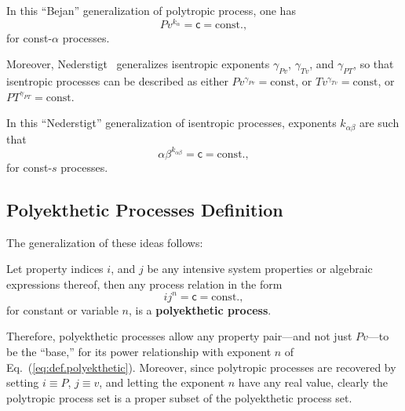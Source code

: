     In this ``Bejan'' generalization of polytropic process, one has
    \begin{equation}
        Pv^{k_{\alpha}} = \mathsf{c} = \mbox{const.},
        \label{eq:gen.Bejan}
    \end{equation}
    \noindent for const-$\alpha$ processes.

    Moreover,  Nederstigt~\cite{2017-NederstigtP-TUDelft}   generalizes   isentropic   exponents
    $\gamma_{Pv}$, $\gamma_{Tv}$,  and  $\gamma_{PT}$,  so  that  isentropic  processes  can  be
    described as either $Pv^{\gamma_{Pv}} = \mbox{const}$, or $Tv^{\gamma_{Tv}} = \mbox{const}$,
    or $PT^{\gamma_{PT}} = \mbox{const}$.

    In this ``Nederstigt'' generalization of isentropic processes,  exponents  $k_{\alpha\beta}$
    are such that
    \begin{equation}
        \alpha\beta^{k_{\alpha\beta}} = \mathsf{c} = \mbox{const.},
        \label{eq:gen.Nederstigt}
    \end{equation}
    \noindent for const-$s$ processes.

    \subsection{Polyekthetic Processes Definition}

    The generalization of these ideas follows:

    \begin{definition}\label{def:polyekthetic}
        Let property indices $i$, and $j$  be  any  intensive  system  properties  or  algebraic
        expressions thereof, then any process relation in the form
        \begin{equation}
            ij^n = \mathsf{c} = \mbox{const.},
            \label{eq:def.polyekthetic}
        \end{equation}
        \noindent for constant or variable $n$, is a \textbf{polyekthetic process}.
    \end{definition}

    Therefore, polyekthetic processes allow any property pair---and not just  $Pv$---to  be  the
    ``base,'' for its power relationship with exponent $n$  of  Eq.~(\ref{eq:def.polyekthetic}).
    Moreover, since polytropic processes are recovered by setting $i \equiv P$,  $j  \equiv  v$,
    and letting the exponent $n$ have any real value, clearly the polytropic process  set  is  a
    proper subset of the polyekthetic process set.

